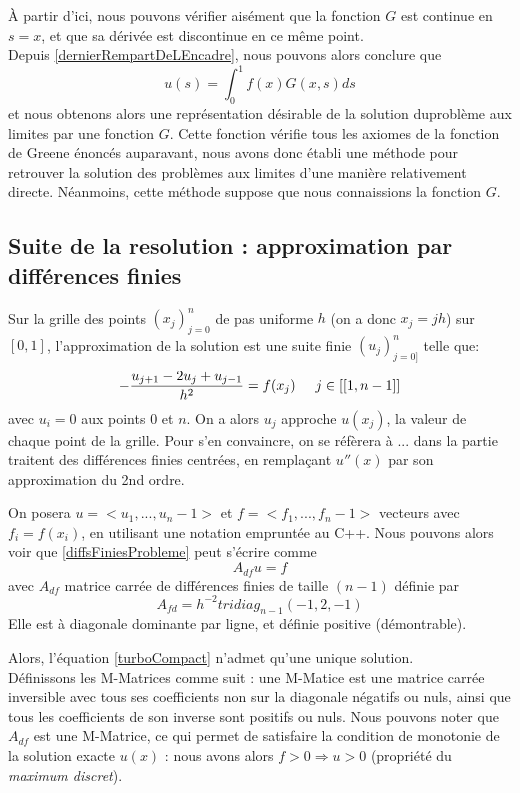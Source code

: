 \documentclass[12pt]{article}
\newcommand{\espace}{\hspace{5mm}}
\begin{document}
À partir d'ici, nous pouvons vérifier aisément que la fonction $G$ est continue en $s=x$, et que sa dérivée est discontinue en ce même point.
\\
Depuis \eqref{dernierRempartDeLEncadre}, nous pouvons alors conclure que
\begin{equation}
u(s) = \int_0^1 f(x)G(x, s) ds
\end{equation}
et nous obtenons alors une représentation désirable de la solution duproblème aux limites par une fonction $G$. Cette fonction vérifie tous les axiomes de la fonction de Greene énoncés auparavant, nous avons donc établi une méthode pour retrouver la solution des problèmes aux limites d'une manière relativement directe. Néanmoins, cette méthode suppose que nous connaissions la fonction $G$.

\subsection{Suite de la resolution : approximation par différences finies}

Sur la grille des points $(x_j)_{j = 0}^n$ de pas uniforme $h$ (on a donc $x_j = jh$) sur $[0,1]$, l'approximation de la solution est une suite finie $(u_j)_{j = 0]}^n$ telle que:
\begin{equation} \label{diffsFiniesProbleme}
	- \frac{u_{j+1} - 2u_j + u_{j-1}}{h^2} = f(x_j) \espace j \in [[1, n-1]]
\end{equation} 
avec $u_i = 0$ aux points $0$ et $n$. On a alors $u_j$ approche $u(x_j)$, la valeur de chaque point de la grille. Pour s'en convaincre, on se réfèrera à ... dans la partie traitent des différences finies centrées, en remplaçant $u''(x)$ par son approximation du 2nd ordre.

On posera $u = <u_1, ..., u_n-1>$ et $f = <f_1, ..., f_n-1>$ vecteurs avec $f_i = f(x_i)$, en utilisant une notation empruntée au C++. Nous pouvons alors voir que \eqref{diffsFiniesProbleme} peut s'écrire comme
\begin{equation} \label{turboCompact}
	A_{df}u = f
\end{equation}
avec $A_{df}$ matrice carrée de différences finies de taille $(n-1)$ définie par
\begin{equation}
	A_{fd} = h^{-2} tridiag_{n-1} (-1, 2, -1)
\end{equation}
Elle est à diagonale dominante par ligne, et définie positive (démontrable).

Alors, l'équation \eqref{turboCompact} n'admet qu'une unique solution.\\ Définissons les M-Matrices comme suit : une M-Matice est une matrice carrée inversible avec tous ses coefficients non sur la diagonale négatifs ou nuls, ainsi que tous les coefficients de son inverse sont positifs ou nuls.
Nous pouvons noter que $A_{df}$ est une M-Matrice, ce qui permet de satisfaire la condition de monotonie de la solution exacte $u(x)$ : nous avons alors $f >0 \Longrightarrow u>0$ (propriété du \emph{maximum discret}).
\end{document}
